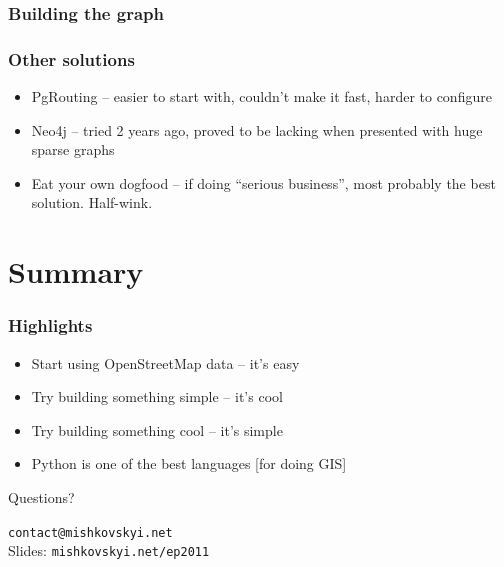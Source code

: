 \documentclass[14pt]{beamer}
\begin{document}
\begin{frame}
  \frametitle{Building the graph}
\end{frame}


\begin{frame}
  \frametitle{Other solutions}
  \begin{itemize}
  \item PgRouting -- easier to start with, couldn't make it fast,
    harder to configure
  \item Neo4j -- tried 2 years ago, proved to be lacking when
    presented with huge sparse graphs
  \item Eat your own dogfood -- if doing ``serious business'', most
    probably the best solution. Half-wink.
  \end{itemize}
\end{frame}

\section*{Summary}

\begin{frame}
  \begin{center}
  \end{center}
\end{frame}

\begin{frame}
  \frametitle{Highlights}
  \begin{itemize}
  \item Start using OpenStreetMap data -- it's easy
  \item Try building something simple -- it's cool
  \item Try building something cool -- it's simple
  \item Python is one of the best languages [for doing GIS]
  \end{itemize}
\end{frame}

\begin{frame}
  \begin{center}
    \LARGE{Questions?}
  \end{center}
  \vfill
  \begin{center}
    \texttt{contact@mishkovskyi.net}\\
    Slides: \texttt{mishkovskyi.net/ep2011}
  \end{center}
\end{frame}
\end{document}
